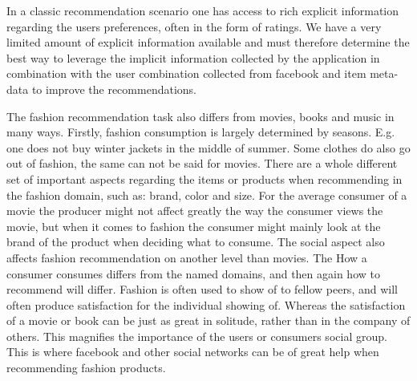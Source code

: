 In a classic recommendation scenario one has access to rich explicit information regarding the users preferences, often in the form of ratings. We have a very limited amount of explicit information available and must therefore determine the best way to leverage the implicit information collected by the application in combination with the user combination collected from facebook and item meta-data to improve the recommendations.

The fashion recommendation task also differs from movies, books and music in many ways.
Firstly, fashion consumption is largely determined by seasons.
E.g. one does not buy winter jackets in the middle of summer.
Some clothes do also go out of fashion, the same can not be said for movies.
There are a whole different set of important aspects regarding the items or products when recommending in the fashion domain, such as: brand, color and size.
For the average consumer of a movie the producer might not affect greatly the way the consumer views the movie, but when it comes to fashion the consumer might mainly look at the brand of the product when deciding what to consume.
The social aspect also affects fashion recommendation on another level than movies.
The %
How a consumer consumes differs from the named domains, and then again how to recommend will differ.
Fashion is often used to show of to fellow peers, and will often produce satisfaction for the individual showing of.
Whereas the satisfaction of a movie or book can be just as great in solitude, rather than in the company of others.
This magnifies the importance of the users or consumers social group.
This is where facebook and other social networks can be of great help when recommending fashion products.



